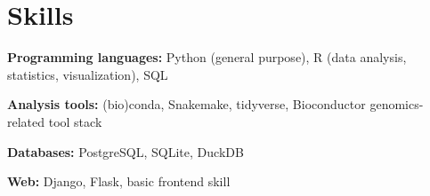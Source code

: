 \section{Skills}

\begin{multicols}{2}
\begin{compactentrylist}

\item \textbf{Programming languages:}
    Python (general purpose),
    R (data analysis, statistics, visualization),
    SQL

\item \textbf{Analysis tools:} (bio)conda, Snakemake, tidyverse, Bioconductor genomics-related tool stack

\item \textbf{Databases:} PostgreSQL, SQLite, DuckDB

\item \textbf{Web:} Django, Flask, basic frontend skill

\end{compactentrylist}
\end{multicols}
